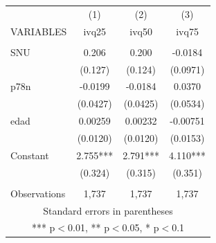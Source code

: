 \begin{tabular}{lccc} \hline
 & (1) & (2) & (3) \\
VARIABLES & ivq25 & ivq50 & ivq75 \\ \hline
 &  &  &  \\
SNU & 0.206 & 0.200 & -0.0184 \\
 & (0.127) & (0.124) & (0.0971) \\
p78n & -0.0199 & -0.0184 & 0.0370 \\
 & (0.0427) & (0.0425) & (0.0534) \\
edad & 0.00259 & 0.00232 & -0.00751 \\
 & (0.0120) & (0.0120) & (0.0153) \\
Constant & 2.755*** & 2.791*** & 4.110*** \\
 & (0.324) & (0.315) & (0.351) \\
 &  &  &  \\
 Observations & 1,737 & 1,737 & 1,737 \\ \hline
\multicolumn{4}{c}{ Standard errors in parentheses} \\
\multicolumn{4}{c}{ *** p$<$0.01, ** p$<$0.05, * p$<$0.1} \\
\end{tabular}
